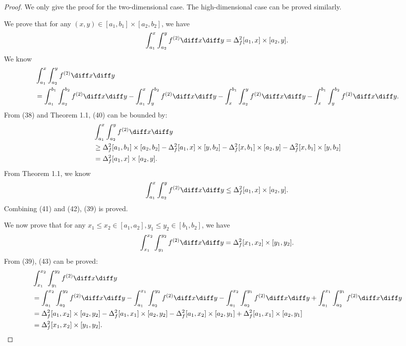 \documentclass{ijclclp}
\begin{document}
\begin{proof}
    We only give the proof for the two-dimensional case. The high-dimensional case can be proved similarly.
    
    We prove that for any \((x,y)\in[a_1,b_1]\times[a_2,b_2]\), we have
    \begin{equation}
        \int_{a_1}^{x}\int_{a_2}^{y}f^{(2)}\diff x\diff y=\Delta_f^2[a_1,x]\times[a_2,y].
    \end{equation}
    We know
    \begin{equation}
        \begin{aligned}[b]
            &\int_{a_1}^{x}\int_{a_2}^{y}f^{(2)}\diff x\diff y\\
            &=
            \int_{a_1}^{b_1}\int_{a_2}^{b_2}f^{(2)}\diff x\diff y-
            \int_{a_1}^{x}\int_{y}^{b_2}f^{(2)}\diff x\diff y-
            \int_{x}^{b_1}\int_{a_2}^{y}f^{(2)}\diff x\diff y-
            \int_{x}^{b_1}\int_{y}^{b_2}f^{(2)}\diff x\diff y.
        \end{aligned}
    \end{equation}
    From (38) and Theorem 1.1, (40) can be bounded by:
    \begin{equation}
        \begin{aligned}[b]
            &\int_{a_1}^{x}\int_{a_2}^{y}f^{(2)}\diff x\diff y\\
            &\geq\Delta_f^2[a_1,b_1]\times[a_2,b_2]-\Delta_f^2[a_1,x]\times[y,b_2]-\Delta_f^2[x,b_1]\times[a_2,y]-\Delta_f^2[x,b_1]\times[y,b_2]\\
            &=\Delta_f^2[a_1,x]\times[a_2,y].
        \end{aligned}
    \end{equation}
    From Theorem 1.1, we know
    \begin{equation}
        \int_{a_1}^{x}\int_{a_2}^{y}f^{(2)}\diff x\diff y\leq\Delta_f^2[a_1,x]\times[a_2,y].
    \end{equation}
    Combining (41) and (42), (39) is proved.

    We now prove that for any \(x_1\leq x_2\in[a_1,a_2],y_1\leq y_2\in[b_1,b_2]\), we have
    \begin{equation}
        \int_{x_1}^{x_2}\int_{y_1}^{y_2}f^{(2)}\diff x\diff y=\Delta_f^2[x_1,x_2]\times[y_1,y_2].
    \end{equation}
    From (39), (43) can be proved:
    \begin{align*}
        &\int_{x_1}^{x_2}\int_{y_1}^{y_2}f^{(2)}\diff x\diff y\\
        &=\int_{a_1}^{x_2}\int_{a_2}^{y_2}f^{(2)}\diff x\diff y-\int_{a_1}^{x_1}\int_{a_2}^{y_2}f^{(2)}\diff x\diff y-
            \int_{a_1}^{x_2}\int_{a_2}^{y_1}f^{(2)}\diff x\diff y+
            \int_{a_1}^{x_1}\int_{a_2}^{y_1}f^{(2)}\diff x\diff y\\
        &=\Delta_f^2[a_1,x_2]\times[a_2,y_2]-\Delta_f^2[a_1,x_1]\times[a_2,y_2]-\Delta_f^2[a_1,x_2]\times[a_2,y_1]+\Delta_f^2[a_1,x_1]\times[a_2,y_1]\\
        &=\Delta_f^2[x_1,x_2]\times[y_1,y_2].
    \end{align*}    


\end{proof}
\end{document}
